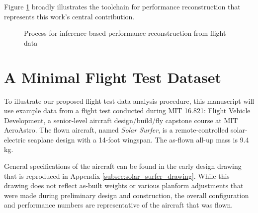 \documentclass[conf]{new-aiaa}
\begin{document}
    Figure \ref{fig:overall_procedure} broadly illustrates the toolchain for performance reconstruction that represents this work's central contribution.

    \begin{figure}[!htb]
        \centering
        \caption{Process for inference-based performance reconstruction from flight data}
        \label{fig:overall_procedure}
    \end{figure}


    \section{A Minimal Flight Test Dataset}

    To illustrate our proposed flight test data analysis procedure, this manuscript will use example data from a flight test conducted during MIT 16.821: Flight Vehicle Development, a senior-level aircraft design/build/fly capstone course at MIT AeroAstro. The flown aircraft, named \emph{Solar Surfer}, is a remote-controlled solar-electric seaplane design with a 14-foot wingspan. The as-flown all-up mass is 9.4 kg.

    General specifications of the aircraft can be found in the early design drawing that is reproduced in Appendix \ref{subsec:solar_surfer_drawing}. While this drawing does not reflect as-built weights or various planform adjustments that were made during preliminary design and construction, the overall configuration and performance numbers are representative of the aircraft that was flown.
\end{document}
